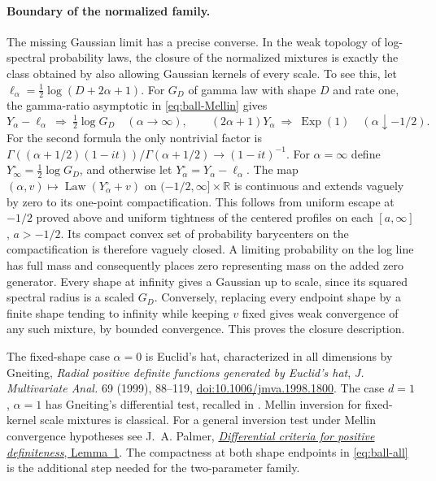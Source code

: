 \documentclass[11pt,a4paper]{article}
\numberwithin{equation}{section}
\begin{document}
\paragraph{Boundary of the normalized family.}
The missing Gaussian limit has a precise converse. In the weak topology
of log-spectral probability laws, the closure of the normalized mixtures
is exactly the class obtained by also allowing Gaussian kernels of every
scale. To see this, let
$\ell_\alpha=\frac12\log(D+2\alpha+1)$. For $G_D$ of gamma law
with shape $D$ and rate one, the gamma-ratio asymptotic in
\eqref{eq:ball-Mellin} gives
\[
 Y_\alpha-\ell_\alpha\ \Longrightarrow\ \tfrac12\log G_D
 \quad(\alpha\to\infty),\qquad
 (2\alpha+1)Y_\alpha\ \Longrightarrow\ \operatorname{Exp}(1)
 \quad(\alpha\downarrow-1/2).
\]
For the second formula the only nontrivial factor is
$\Gamma((\alpha+1/2)(1-it))/\Gamma(\alpha+1/2)\to(1-it)^{-1}$.
For $\alpha=\infty$ define $Y_\infty^{\circ}=\frac12\log G_D$,
and otherwise let $Y_\alpha^{\circ}=Y_\alpha-\ell_\alpha$.
The map $(\alpha,v)\mapsto\operatorname{Law}(Y_\alpha^{\circ}+v)$
on $(-1/2,\infty]\times\mathbb R$ is continuous and extends vaguely
by zero to its one-point compactification. This follows from uniform escape
at $-1/2$ proved above and uniform tightness of the centered profiles on
each $[a,\infty]$, $a>-1/2$. Its compact convex set of probability
barycenters on the compactification is therefore vaguely closed.
A limiting probability on the log line has full mass and consequently
places zero representing mass on the added zero generator. Every shape
at infinity gives a Gaussian up to scale, since its squared spectral
radius is a scaled $G_D$. Conversely, replacing every endpoint shape
by a finite shape tending to infinity while keeping $v$ fixed gives
weak convergence of any such mixture, by bounded convergence.
This proves the closure description.

The fixed-shape case $\alpha=0$ is Euclid's hat, characterized in all
dimensions by Gneiting, \emph{Radial positive definite functions
generated by Euclid's hat}, \emph{J. Multivariate Anal.} 69 (1999),
88--119, \href{https://doi.org/10.1006/jmva.1998.1800}{doi:10.1006/jmva.1998.1800}.
The case $d=1$, $\alpha=1$ has Gneiting's differential test, recalled
in \cite[Section 5.2]{JMR2009}. Mellin inversion for fixed-kernel
scale mixtures is classical. For a general inversion test under
Mellin convergence hypotheses see
J.~A. Palmer, \href{https://sccn.ucsd.edu/~jason/scalediff4.pdf}
{\emph{Differential criteria for positive definiteness}, Lemma~1}.
The compactness at both shape endpoints in \eqref{eq:ball-all}
is the additional step needed for the two-parameter family.
\end{document}
